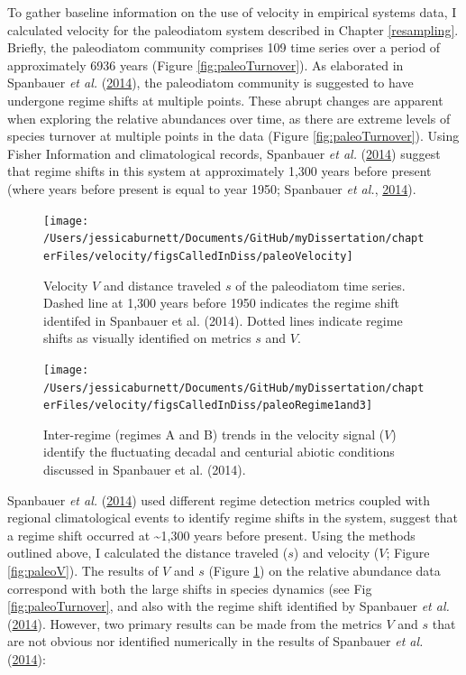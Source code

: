 \documentclass[12pt,twoside,openany]{reedthesis}
\begin{document}
To gather baseline information on the use of velocity in empirical systems data, I calculated velocity for the paleodiatom system described in Chapter \ref{resampling}. Briefly, the paleodiatom community comprises 109 time series over a period of approximately 6936 years (Figure \ref{fig:paleoTurnover}). As elaborated in Spanbauer \emph{et al.} (\protect\hyperlink{ref-spanbauer_prolonged_2014}{2014}), the paleodiatom community is suggested to have undergone regime shifts at multiple points. These abrupt changes are apparent when exploring the relative abundances over time, as there are extreme levels of species turnover at multiple points in the data (Figure \ref{fig:paleoTurnover}). Using Fisher Information and climatological records, Spanbauer \emph{et al.} (\protect\hyperlink{ref-spanbauer_prolonged_2014}{2014}) suggest that regime shifts in this system at approximately 1,300 years before present (where years before present is equal to year 1950; Spanbauer \emph{et al.}, \protect\hyperlink{ref-spanbauer_prolonged_2014}{2014}).
\begin{figure}
\texttt{[image: /Users/jessicaburnett/Documents/GitHub/myDissertation/chapterFiles/velocity/figsCalledInDiss/paleoVelocity]} \caption{Velocity $V$ and distance traveled $s$ of the paleodiatom time series. Dashed line at 1,300 years before 1950 indicates the regime shift identifed in Spanbauer et al. (2014). Dotted lines indicate regime shifts as visually identified on metrics $s$ and $V$.}\label{fig:paleoVelocity}
\end{figure}
\begin{figure}
\texttt{[image: /Users/jessicaburnett/Documents/GitHub/myDissertation/chapterFiles/velocity/figsCalledInDiss/paleoRegime1and3]} \caption{Inter-regime (regimes A and B) trends in the velocity signal ($V$) identify  the fluctuating decadal and centurial abiotic conditions discussed in  Spanbauer et al. (2014).}\label{fig:paleoRegime1and3}
\end{figure}
Spanbauer \emph{et al.} (\protect\hyperlink{ref-spanbauer_prolonged_2014}{2014}) used different regime detection metrics coupled with regional climatological events to identify regime shifts in the system, suggest that a regime shift occurred at \textasciitilde1,300 years before present. Using the methods outlined above, I calculated the distance traveled (\(s\)) and velocity (\(V\); Figure \ref{fig:paleoV}). The results of \(V\) and \(s\) (Figure \ref{fig:paleoVelocity}) on the relative abundance data correspond with both the large shifts in species dynamics (see Fig \ref{fig:paleoTurnover}, and also with the regime shift identified by Spanbauer \emph{et al.} (\protect\hyperlink{ref-spanbauer_prolonged_2014}{2014}). However, two primary results can be made from the metrics \(V\) and \(s\) that are not obvious nor identified numerically in the results of Spanbauer \emph{et al.} (\protect\hyperlink{ref-spanbauer_prolonged_2014}{2014}):
\end{document}
